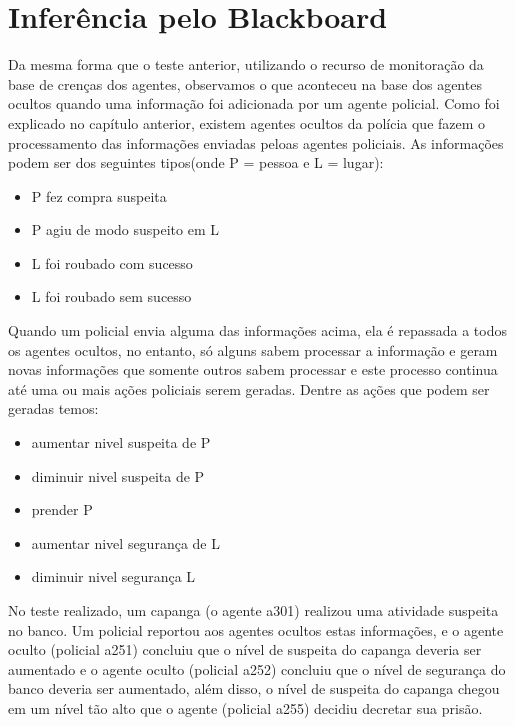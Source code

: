 \section{Inferência pelo Blackboard}
Da mesma forma que o teste anterior, utilizando o recurso de monitoração da base de crenças dos agentes, observamos o que aconteceu na base dos agentes ocultos quando uma informação foi adicionada por um agente policial.
Como foi explicado no capítulo anterior, existem agentes ocultos da polícia que fazem o processamento das informações enviadas peloas agentes policiais. As informações podem ser dos seguintes tipos(onde P = pessoa e L = lugar):
\begin{itemize}
\item P fez compra suspeita
\item P agiu de modo suspeito em L
\item L foi roubado com sucesso
\item L foi roubado sem sucesso
\end{itemize}
Quando um policial envia alguma das informações acima, ela é repassada a todos os agentes ocultos, no entanto, só alguns sabem processar a informação e geram novas informações que somente outros sabem processar e este processo continua até uma ou mais ações policiais serem geradas.
Dentre as ações que podem ser geradas temos:
\begin{itemize}
\item aumentar nivel suspeita de P
\item diminuir nivel suspeita de P
\item prender P
\item aumentar nivel segurança de L
\item diminuir nivel segurança L 
\end{itemize}
No teste realizado, um capanga (o agente a301) realizou uma atividade suspeita no banco. Um policial reportou aos agentes ocultos estas informações, e o agente oculto (policial a251) concluiu que o nível de suspeita do capanga deveria ser aumentado e o agente oculto (policial a252) concluiu que o nível de segurança do banco deveria ser aumentado, além disso, o nível de suspeita do capanga chegou em um nível tão alto que o agente (policial a255) decidiu decretar sua prisão.
